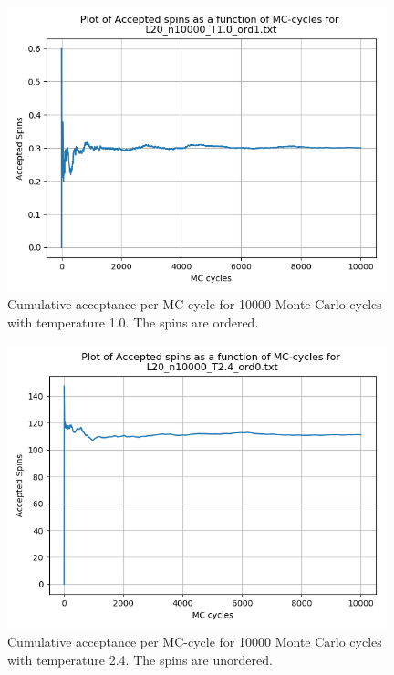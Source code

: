 \documentclass{article}
\begin{document}
  \begin{figure}[ht]
      \centering
      \includegraphics[width = 11cm]{img/accept_L20_n10000_T10_ord1.png}
      \caption{Cumulative acceptance per MC-cycle for 10000 Monte Carlo cycles with temperature 1.0. The spins are ordered. }
      \label{fig:accept_L20_n10000_T1.0_ord1}
    \end{figure}

  \begin{figure}[ht]
      \centering
      \includegraphics[width = 11cm]{img/accept_L20_n10000_T24_ord0.png}
      \caption{Cumulative acceptance per MC-cycle for 10000 Monte Carlo cycles with temperature 2.4. The spins are unordered. }
      \label{fig:accept_L20_n10000_T2.4_ord0}
    \end{figure}
\end{document}

